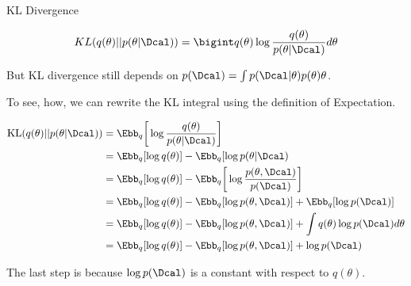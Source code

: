 \documentclass[aspectratio=169,xcolor=dvipsnames,svgnames,x11names,fleqn]{beamer}
\begin{document}
\begin{frame}[allowframebreaks]{KL Divergence}

\begin{definition}

\begin{align*}
KL( q(\theta) || p(\theta | \Dcal) ) = \bigint q(\theta) \log \frac{q(\theta)}{p(\theta | \Dcal)} d\theta
\end{align*}

\end{definition}





But KL divergence still depends on $p(\Dcal) = \int p(\Dcal | \theta) p(\theta)\theta$.

To see, how, we can rewrite the KL integral using the definition of Expectation.

\begin{tcolorbox}[
    enhanced,                          %
    colback=gray!5!white,              %
    colframe=teal!75!black,            %
    boxrule=0.5pt,                     %
    left=4mm,                          %
    enlarge left by=0.1mm,               %
    sharp corners,                     %
    borderline west={3pt}{0pt}{teal},  %
    drop lifted shadow=black!30!white, %
    fonttitle=\bfseries\sffamily,      %
    coltitle=white,                    %
    attach boxed title to top left={   %
        xshift=0.1mm, 
        yshift=-0.1mm, 
        yshifttext=-0.1mm 
    },
    boxed title style={
        colback=teal!75!black, 
        sharp corners, 
        boxrule=0pt
    },
    title={}    %
]

\begin{align*}
\text{KL}(q(\theta)  || p(\theta|\Dcal))  & = \Ebb_q \bigg[ \log \frac{q(\theta)}{p(\theta | \Dcal)} \bigg]\\
& = \Ebb_q [ \log q(\theta) ]  - \Ebb_q [ \log p(\theta | \Dcal)\\
& = \Ebb_q [ \log q(\theta) ]  - \Ebb_q \bigg[ \log \frac{p(\theta , \Dcal)}{p(\Dcal)}\bigg]\\
& = \Ebb_q [ \log q(\theta) ]  - \Ebb_q[\log p(\theta, \Dcal) ]  + \Ebb_q[ \log p(\Dcal) ] \\
& = \Ebb_q [ \log q(\theta) ]  - \Ebb_q[\log p(\theta, \Dcal) ]  + \int q(\theta) \log p(\Dcal) d \theta\\
& = \Ebb_q [ \log q(\theta) ]  - \Ebb_q[\log p(\theta, \Dcal) ]  + \log p(\Dcal) 
\end{align*}
\end{tcolorbox}
The last step is because $\log p(\Dcal)$ is a constant with respect to $q(\theta)$. 


\end{frame}
\end{document}
